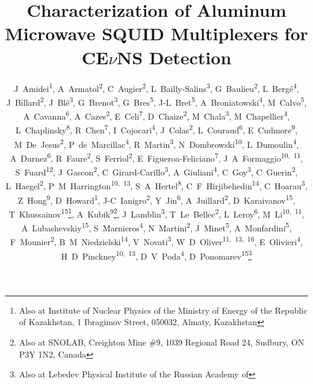 \documentclass[10pt]{iopart}
\newcommand{\cevns}{CE$\nu$NS\xspace}
\begin{document}
\title{Characterization of Aluminum Microwave SQUID Multiplexers for \cevns Detection}

\author{\mbox{J Amidei\textsuperscript{1}}, \mbox{A Armatol\textsuperscript{2}}, \mbox{C Augier\textsuperscript{2}}, \mbox{L Bailly-Salins\textsuperscript{3}}, \mbox{G Baulieu\textsuperscript{2}}, \mbox{L Bergé\textsuperscript{4}}, \mbox{J Billard\textsuperscript{2}}, \mbox{J Blé\textsuperscript{3}}, \mbox{G Brenot\textsuperscript{3}}, \mbox{G Bres\textsuperscript{5}}, \mbox{J-L Bret\textsuperscript{5}}, \mbox{A Broniatowski\textsuperscript{4}}, \mbox{M Calvo\textsuperscript{5}}, \mbox{A Cavanna\textsuperscript{6}}, \mbox{A Cazes\textsuperscript{2}}, \mbox{E Celi\textsuperscript{7}}, \mbox{D Chaize\textsuperscript{2}}, \mbox{M Chala\textsuperscript{3}}, \mbox{M Chapellier\textsuperscript{4}}, \mbox{L Chaplinsky\textsuperscript{8}}, \mbox{R Chen\textsuperscript{7}}, \mbox{I Cojocari\textsuperscript{4}}, \mbox{J Colas\textsuperscript{2}}, \mbox{L Couraud\textsuperscript{6}}, \mbox{E Cudmore\textsuperscript{9}}, \mbox{M De Jesus\textsuperscript{2}}, \mbox{P de Marcillac\textsuperscript{4}}, \mbox{R Martin\textsuperscript{3}}, \mbox{N Dombrowski\textsuperscript{10}}, \mbox{L Dumoulin\textsuperscript{4}}, \mbox{A Durnez\textsuperscript{6}}, \mbox{R Faure\textsuperscript{2}}, \mbox{S Ferriol\textsuperscript{2}}, \mbox{E Figueroa-Feliciano\textsuperscript{7}}, \mbox{J  A Formaggio\textsuperscript{10, 11}}, \mbox{S Fuard\textsuperscript{12}}, \mbox{J Gascon\textsuperscript{2}}, \mbox{C Girard-Carillo\textsuperscript{3}}, \mbox{A Giuliani\textsuperscript{4}}, \mbox{C Goy\textsuperscript{3}}, \mbox{C Guerin\textsuperscript{2}}, \mbox{L Haegel\textsuperscript{2}}, \mbox{P  M Harrington\textsuperscript{10, 13}}, \mbox{S A Hertel\textsuperscript{8}}, \mbox{C  F Hirjibehedin\textsuperscript{14}}, \mbox{C Hoarau\textsuperscript{3}}, \mbox{Z Hong\textsuperscript{9}}, \mbox{D Howard\textsuperscript{1}}, \mbox{J-C Ianigro\textsuperscript{2}}, \mbox{Y Jin\textsuperscript{6}}, \mbox{A Juillard\textsuperscript{2}}, \mbox{D Karaivanov\textsuperscript{15}}, \mbox{T Khussainov\textsuperscript{15}}\footnote{Also at Institute of Nuclear Physics of the Ministry of Energy of the Republic of Kazakhstan, 1 Ibragimov Street, 050032, Almaty, Kazakhstan}, \mbox{A Kubik\textsuperscript{9}}\footnote{Also at SNOLAB, Creighton Mine \#9, 1039 Regional Road 24, Sudbury, ON P3Y 1N2, Canada}, \mbox{J Lamblin\textsuperscript{3}}, \mbox{T Le Bellec\textsuperscript{2}}, \mbox{L Leroy\textsuperscript{6}}, \mbox{M Li\textsuperscript{10, 11}}, \mbox{A Lubashevskiy\textsuperscript{15}}, \mbox{S Marnieros\textsuperscript{4}}, \mbox{N Martini\textsuperscript{2}}, \mbox{J Minet\textsuperscript{5}}, \mbox{A Monfardini\textsuperscript{5}}, \mbox{F Mounier\textsuperscript{2}}, \mbox{B  M Niedzielski\textsuperscript{14}}, \mbox{V Novati\textsuperscript{3}}, \mbox{W  D Oliver\textsuperscript{11, 13, 16}}, \mbox{E Olivieri\textsuperscript{4}}, \mbox{H D Pinckney\textsuperscript{10, 13}}, \mbox{D V Poda\textsuperscript{4}}, \mbox{D Ponomarev\textsuperscript{15}}\footnote{Also at Lebedev Physical Institute of the Russian Academy of
}}
\end{document}
